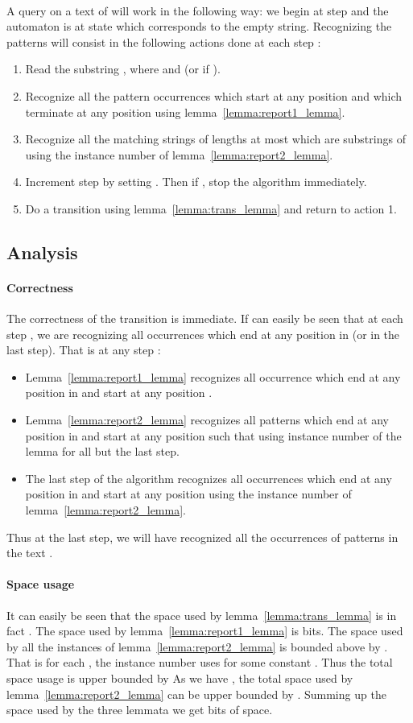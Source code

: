 \documentclass{article}
\newcommand{\?}{\mskip1.5mu}
\begin{document}
\\ A query on a text of  will work in the following way: we begin at step  and the automaton is at state  which corresponds to the empty string. Recognizing the patterns will consist in the following actions done at each step : 
\begin{enumerate}
\item Read the substring , where  and  (or  if ). 
\item Recognize all the pattern occurrences which start at any position  and which terminate at any position  using lemma~\ref{lemma:report1_lemma}. 
\item Recognize all the matching strings of lengths at most  which are substrings of  using the instance number  of lemma~\ref{lemma:report2_lemma}.
\item Increment step  by setting . Then if , stop the algorithm immediately. 
\item Do a transition using lemma~\ref{lemma:trans_lemma} and return to action 1. 
\end{enumerate}
\subsection{Analysis}
\paragraph{Correctness}
The correctness of the transition is immediate. If can easily be seen that at each step , we are recognizing all occurrences which end at any position in  (or  in the last step). That is at any step :
\begin{itemize}
\item Lemma~\ref{lemma:report1_lemma} recognizes all occurrence which end at any position in  and start at any position .
\item Lemma~\ref{lemma:report2_lemma} recognizes all patterns which end at any position in  and start at any position  such that  using instance number  of the lemma for all but the last step. 
\item The last step of the algorithm recognizes all occurrences which end at any position in  and start at any position  using the instance number  of lemma~\ref{lemma:report2_lemma}. 
\end{itemize} 
Thus at the last step, we will have recognized all the occurrences of patterns in the text . 

\paragraph{Space usage}
It can easily be seen that the space used by lemma~\ref{lemma:trans_lemma} is in fact . The space used by lemma~\ref{lemma:report1_lemma} is  bits. The space used by all the instances of lemma~\ref{lemma:report2_lemma} is bounded above by . That is for each , the instance number  uses  for some constant . Thus the total space usage is upper bounded by  
As we have , the total space used by lemma~\ref{lemma:report2_lemma} can be upper bounded by . Summing up the space used by the three lemmata we get  bits of space.
\end{document}
